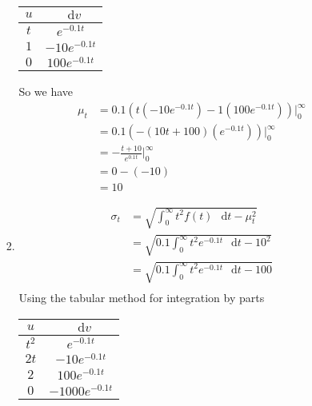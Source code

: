 \documentclass[12pt,letterpaper]{article}
\newcommand*\dif{\mathop{}\!\mathrm{d}}
\begin{document}
\begin{enumerate}
\begin{enumerate}
\begin{enumerate}[label=(\arabic*)]
              \begin{tabular}{| c | c |}
                \hline
                $u$ & $\dif v$ \\
                \hline
                $t$ & $e^{-0.1 t}$    \\
                $1$ & $-10e^{-0.1 t}$ \\
                $0$ & $100e^{-0.1 t}$ \\
                \hline
              \end{tabular}

              So we have
              \begin{align*}
                \mu_t &= 0.1 \left(t (-10e^{-0.1 t}) - 1 (100e^{-0.1 t}) \right) \Big|_0^{\infty} \\
                &= 0.1 \left(-(10t + 100) (e^{-0.1 t}) \right) \Big|_0^{\infty} \\
                &= -\frac{t + 10}{e^{0.1 t}} \Big|_0^{\infty} \\
                &= 0 - (-10) \\
                &= 10
              \end{align*}
            \item
              \begin{align*}
                \sigma_t &= \sqrt{\int_0^\infty \! t^2 f(t) \, \dif t - \mu_t^2} \\
                &= \sqrt{0.1 \int_0^\infty \! t^2 e^{-0.1 t} \, \dif t - 10^2} \\
                &= \sqrt{0.1 \int_0^\infty \! t^2 e^{-0.1 t} \, \dif t - 100} \\
              \end{align*}
              Using the tabular method for integration by parts

              \begin{tabular}{| c | c |}
                \hline
                $u$ & $\dif v$ \\
                \hline
                $t^2$ & $e^{-0.1 t}$    \\
                $2t$  & $-10e^{-0.1 t}$ \\
                $2$   & $100e^{-0.1 t}$ \\
                $0$   & $-1000e^{-0.1 t}$ \\
                \hline
              \end{tabular}


\end{enumerate}
\end{enumerate}
\end{enumerate}
\end{document}
